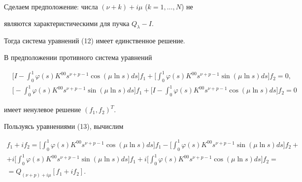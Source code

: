  


Сделаем предположение: числа $(\nu+k)+i\mu$ ($k=1,\dotsc,N$) не 


являются характеристическими для пучка $Q_\lambda-I$. 


Тогда система уравнений (12) имеет единственное решение.





В предположении противного система уравнений 


\begin{equation} 


\begin{split} 


&\bigg[I-\int^1_0\varphi(s)K^{00}s^{\nu+p-1}\cos(\mu\ln s) 


ds\bigg]f_1+\bigg[\int^1_0\varphi(s)K^{00}s^{\nu+p-1} 


\sin(\mu\ln s)ds\bigg]f_2=0,\\ 


% 


&\bigg[-\int^1_0\varphi(s)K^{00}s^{\nu+p-1}\sin(\mu\ln s) 


ds\bigg]f_1+\bigg[I-\int^1_0\varphi(s)K^{00}s^{\nu+p-1} 


\cos(\mu\ln s)ds\bigg]f_2=0 


\end{split} 


\end{equation} 


имеет ненулевое решение $(f_1,f_2)^T$. 


 


Пользуясь уравнениями (13), вычислим 


\begin{gather*} 


f_1+if_2=\bigg[\int^1_0\varphi(s)K^{00}s^{\nu+p-1}\cos(\mu\ln s) 


ds\bigg]f_1-\bigg[\int^1_0\varphi(s)K^{00}s^{\nu+p-1} 


\sin(\mu\ln s)ds\bigg]f_2+\\ 


% 


+i\bigg[\int^1_0\varphi(s)K^{00}s^{\nu+p-1}\sin(\mu\ln s) 


ds\bigg]f_1+i\bigg[\int^1_0\varphi(s)K^{00}s^{\nu+p-1} 


\cos(\mu\ln s)ds\bigg]f_2=\\ 


% 


=Q_{(\nu+p)+i\mu}[f_1+if_2]. 


\end{gather*} 


